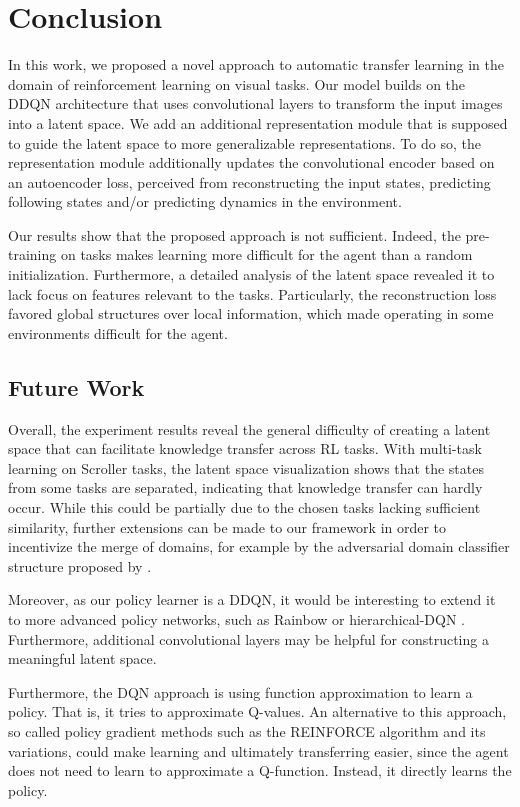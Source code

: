 \section{Conclusion}
\label{sec:conclusion}

In this work, we proposed a novel approach to automatic transfer learning in the domain of reinforcement learning on visual tasks. Our model builds on the DDQN architecture \citep{DDQN} that uses convolutional layers to transform the input images into a latent space. We add an additional representation module that is supposed to guide the latent space to more generalizable representations. To do so, the representation module additionally updates the convolutional encoder based on an autoencoder loss, perceived from reconstructing the input states, predicting following states and/or predicting dynamics in the environment.

Our results show that the proposed approach is not sufficient. Indeed, the pre-training on tasks makes learning more difficult for the agent than a random initialization. Furthermore, a detailed analysis of the latent space revealed it to lack focus on features relevant to the tasks. Particularly, the reconstruction loss favored global structures over local information, which made operating in some environments difficult for the agent.

\subsection{Future Work}
\label{subsec:futurework}
Overall, the experiment results reveal the general difficulty of creating a latent space that can facilitate knowledge transfer across RL tasks.
With multi-task learning on Scroller tasks, the latent space visualization shows that the states from some tasks are separated, indicating that knowledge transfer can hardly occur.
While this could be partially due to the chosen tasks lacking sufficient similarity, further extensions can be made to our framework in order to incentivize the merge of domains, for example by the adversarial domain classifier structure proposed by \citet{ganin2014unsupervised}.

Moreover, as our policy learner is a DDQN, it would be interesting to extend it to more advanced policy networks, such as Rainbow \citep{rainbow} or hierarchical-DQN \citep{hierarchical_dqn}.
Furthermore, additional convolutional layers may be helpful for constructing a meaningful latent space. 

Furthermore, the DQN approach is using function approximation to learn a policy. That is, it tries to approximate Q-values. An alternative to this approach, so called policy gradient methods such as the REINFORCE algorithm \citep{williams1992simple} and its variations, could make learning and ultimately transferring easier, since the agent does not need to learn to approximate a Q-function. Instead, it directly learns the policy.
